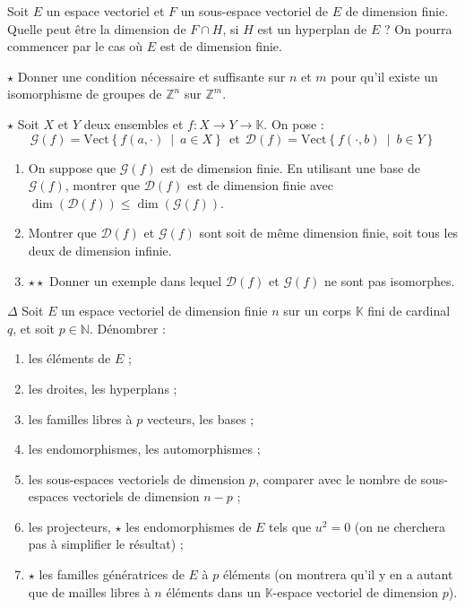 \documentclass[french,a4paper]{article}
\newcommand{\N}{\mathbb{N}}
\newcommand{\Z}{\mathbb{Z}}
\newcommand{\K}{\mathbb{K}}
\theoremstyle{plain}
\theoremstyle{definition}
\theoremstyle{remark}
\begin{document}
\begin{ex}[Moulin.EV.22]{}
	Soit $E$ un espace vectoriel et $F$ un sous-espace vectoriel de $E$ de dimension finie. Quelle peut être la dimension de $F\cap H$, si $H$ est un hyperplan de $E$ ? On pourra commencer par le cas où $E$ est de dimension finie.
\end{ex}

\begin{ex}[Moulin.EV.23]{$\star$}
	Donner une condition nécessaire et suffisante sur $n$ et $m$ pour qu'il existe un isomorphisme de groupes de $\Z^n$ sur $\Z^m$.
\end{ex}

\begin{ex}[Moulin.EV.24]{$\star$}
	Soit $X$ et $Y$ deux ensembles et $f:X\to Y\to\K$. On pose : $$\mathcal{G}(f)=\text{Vect}\left\{f(a,\cdot)\ \mid\ a\in X\right\}\ \ \text{et}\ \ \mathcal{D}(f)=\text{Vect}\left\{f(\cdot,b)\ \mid\ b\in Y\right\}$$
	\begin{enumerate}
		\item On suppose que $\mathcal{G}(f)$ est de dimension finie. En utilisant une base de $\mathcal{G}(f)$, montrer que $\mathcal{D}(f)$ est de dimension finie avec $\dim(\mathcal{D}(f))\leqslant\dim(\mathcal{G}(f))$.
		\item Montrer que $\mathcal{D}(f)$ et $\mathcal{G}(f)$ sont soit de même dimension finie, soit tous les deux de dimension infinie.
		\item $\star\star$ Donner un exemple dans lequel $\mathcal{D}(f)$ et $\mathcal{G}(f)$ ne sont pas isomorphes.
	\end{enumerate}
\end{ex}

\begin{ex}[Moulin.EV.25]{$\Delta$}
	Soit $E$ un espace vectoriel de dimension finie $n$ sur un corps $\K$ fini de cardinal $q$, et soit $p\in\N$. Dénombrer :
	\begin{enumerate}
		\item les éléments de $E$ ;
		\item les droites, les hyperplans ;
		\item les familles libres à $p$ vecteurs, les bases ;
		\item les endomorphismes, les automorphismes ;
		\item les sous-espaces vectoriels de dimension $p$, comparer avec le nombre de sous-espaces vectoriels de dimension $n-p$ ;
		\item les projecteurs, $\star$ les endomorphismes de $E$ tels que $u^2=0$ (on ne cherchera pas à simplifier le résultat) ;
		\item $\star$ les familles génératrices de $E$ à $p$ éléments (on montrera qu'il y en a autant que de mailles libres à $n$ éléments dans un $\K$-espace vectoriel de dimension $p$).
	\end{enumerate}
\end{ex}
\end{document}
